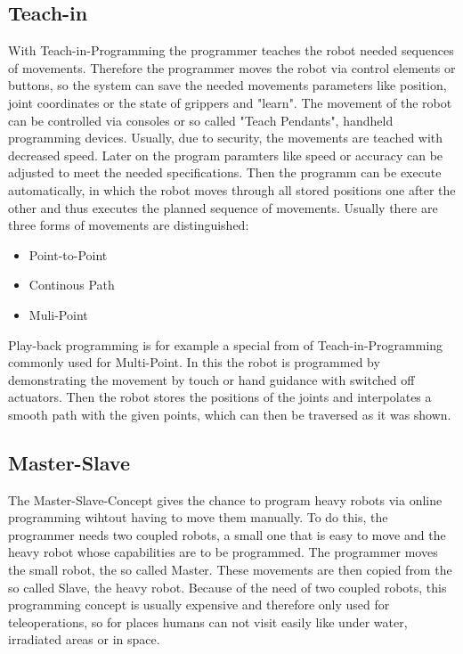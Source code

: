 \documentclass[conference]{IEEEtran}
\begin{document}
    \subsection{Teach-in}
    With Teach-in-Programming the programmer teaches the robot needed sequences of movements. Therefore the programmer moves the robot via control elements or buttons, so the system can save the needed movements parameters like position, joint coordinates or the state of grippers and "learn".  The movement of the robot can be controlled via consoles or so called "Teach Pendants", handheld programming devices. Usually, due to security, the movements are teached with decreased speed. Later on the program paramters like speed or accuracy can be adjusted to meet the needed specifications. Then the programm can be execute automatically, in which the robot moves through all stored positions one after the other and thus executes the planned sequence of movements. %
    Usually there are three forms of movements are distinguished:
    \begin{itemize}
        \item Point-to-Point
        \item Continous Path
        \item Muli-Point
    \end{itemize}

    Play-back programming is for example a special from of Teach-in-Programming commonly used for Multi-Point. In this the robot is programmed by demonstrating the movement by touch or hand guidance with switched off actuators. Then the robot stores the positions of the joints and interpolates a smooth path with the given points, which can then be traversed as it was shown. %

    \subsection{Master-Slave}
    The Master-Slave-Concept gives the chance to program heavy robots via online programming wihtout having to move them manually. To do this, the programmer needs two coupled robots, a small one that is easy to move and the heavy robot whose capabilities are to be programmed. The programmer moves the small robot, the so called Master. These movements are then copied from the so called Slave, the heavy robot. Because of the need of two coupled robots, this programming concept is usually expensive and therefore only used for teleoperations, so for places humans can not visit easily like under water, irradiated areas or in space. %
\end{document}
